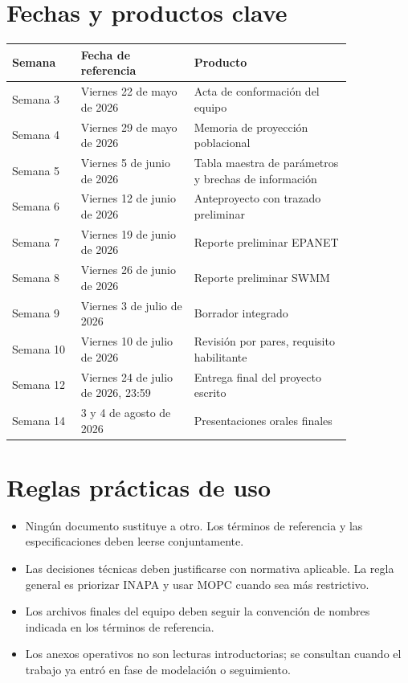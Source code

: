 \documentclass[11pt]{article}
\begin{document}
\section{Fechas y productos clave}
\begin{center}
\begin{tabular}{p{0.17\linewidth} p{0.28\linewidth} p{0.39\linewidth}}
\toprule
\textbf{Semana} & \textbf{Fecha de referencia} & \textbf{Producto} \\
\midrule
Semana 3 & Viernes 22 de mayo de 2026 & Acta de conformaci\'on del equipo \\
Semana 4 & Viernes 29 de mayo de 2026 & Memoria de proyecci\'on poblacional \\
Semana 5 & Viernes 5 de junio de 2026 & Tabla maestra de par\'ametros y brechas de informaci\'on \\
Semana 6 & Viernes 12 de junio de 2026 & Anteproyecto con trazado preliminar \\
Semana 7 & Viernes 19 de junio de 2026 & Reporte preliminar EPANET \\
Semana 8 & Viernes 26 de junio de 2026 & Reporte preliminar SWMM \\
Semana 9 & Viernes 3 de julio de 2026 & Borrador integrado \\
Semana 10 & Viernes 10 de julio de 2026 & Revisi\'on por pares, requisito habilitante \\
Semana 12 & Viernes 24 de julio de 2026, 23:59 & Entrega final del proyecto escrito \\
Semana 14 & 3 y 4 de agosto de 2026 & Presentaciones orales finales \\
\bottomrule
\end{tabular}
\end{center}

\section{Reglas pr\'acticas de uso}
\begin{itemize}
\item Ning\'un documento sustituye a otro. Los t\'erminos de referencia y las especificaciones deben leerse conjuntamente.
\item Las decisiones t\'ecnicas deben justificarse con normativa aplicable. La regla general es priorizar INAPA y usar MOPC cuando sea m\'as restrictivo.
\item Los archivos finales del equipo deben seguir la convenci\'on de nombres indicada en los t\'erminos de referencia.
\item Los anexos operativos no son lecturas introductorias; se consultan cuando el trabajo ya entr\'o en fase de modelaci\'on o seguimiento.
\end{itemize}
\end{document}
